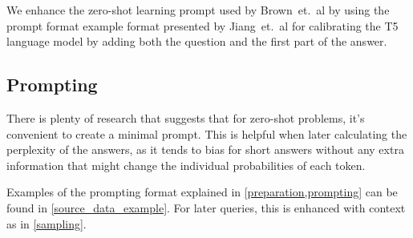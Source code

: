 We enhance the zero-shot learning prompt used by Brown~et.~al\cite{fewshotlearners} by using the prompt format example format presented by Jiang~et.~al\cite{how_can_we_know} for calibrating the T5 language model by adding both the question and the first part of the answer.

\subsection{Prompting}
\label{prompting}

There is plenty of research that suggests that for zero-shot problems\cite{fewshotlearners,beyondfewshot}, it's convenient to create a minimal prompt\cite{how_can_we_know,factual_recall}.
This is helpful when later calculating the perplexity of the answers, as it tends to bias for short answers without any extra information that might change the individual probabilities of each token.

Examples of the prompting format explained in \cref{preparation,prompting} can be found in \cref{source_data_example}.
For later queries, this is enhanced with context as in \cref{sampling}.

